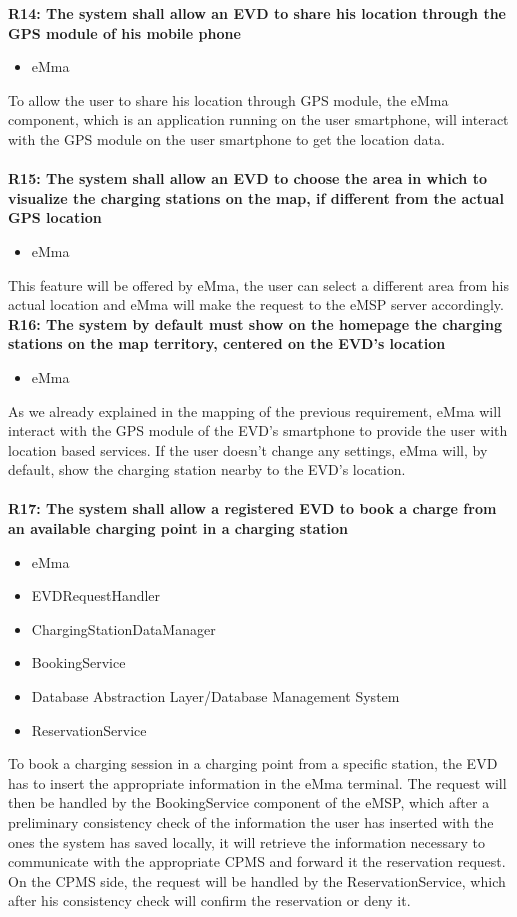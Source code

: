 \textbf{R14: The system shall allow an EVD to share his location through the GPS module of his mobile phone}
\begin{itemize}
	\item eMma
\end{itemize}
To allow the user to share his location through GPS module, the eMma component, which is an application running on the user smartphone, will interact with the GPS module on the user smartphone to get the location data.\\
\\
\textbf{R15: The system shall allow an EVD to choose the area in which to visualize the charging stations on the map, if different from the actual GPS
location}
\begin{itemize}
	\item eMma
\end{itemize}
This feature will be offered by eMma, the user can select a different area from his actual location and eMma will make the request to the eMSP server accordingly.\\
\textbf{R16: The system by default must show on the homepage the charging stations on the map territory, centered on the EVD’s location}
\begin{itemize}
	\item eMma
\end{itemize}
As we already explained in the mapping of the previous requirement, eMma will interact with the GPS module of the EVD's smartphone to provide the user with location based services. If the user doesn't change any settings, eMma will, by default, show the charging station nearby to the EVD's location.\\
\\
\textbf{R17: The system shall allow a registered EVD to book a charge from an available charging point in a charging station}
\begin{itemize}
	\item eMma
	\item EVDRequestHandler
	\item ChargingStationDataManager
	\item BookingService
	\item Database Abstraction Layer/Database Management System
	\item ReservationService
\end{itemize}
To book a charging session in a charging point from a specific station, the EVD has to insert the appropriate information in the eMma terminal. The request will then be handled by the BookingService component of the eMSP, which after a preliminary consistency check of the information the user has inserted with the ones the system has saved locally, it will retrieve the information necessary to communicate with the appropriate CPMS and forward it the reservation request. On the CPMS side, the request will be handled by the ReservationService, which after his consistency check will confirm the reservation or deny it.\\

